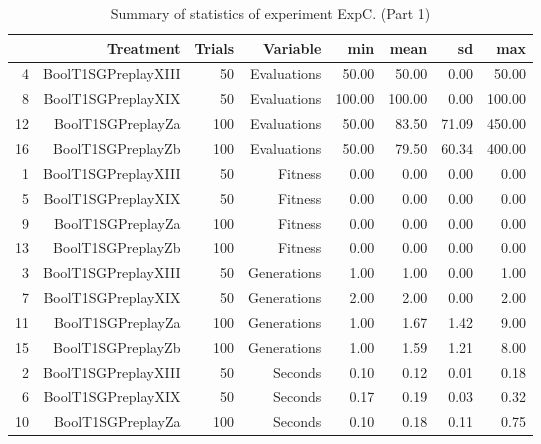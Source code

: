 \begin{table}[ht]
\centering
\begin{tabular}{rrrrrrrr}
  \hline
 & Treatment & Trials & Variable & min & mean & sd & max \\ 
  \hline
4 & BoolT1SGPreplayXIII &  50 & Evaluations & 50.00 & 50.00 & 0.00 & 50.00 \\ 
  8 & BoolT1SGPreplayXIX &  50 & Evaluations & 100.00 & 100.00 & 0.00 & 100.00 \\ 
  12 & BoolT1SGPreplayZa & 100 & Evaluations & 50.00 & 83.50 & 71.09 & 450.00 \\ 
  16 & BoolT1SGPreplayZb & 100 & Evaluations & 50.00 & 79.50 & 60.34 & 400.00 \\ 
  1 & BoolT1SGPreplayXIII &  50 & Fitness & 0.00 & 0.00 & 0.00 & 0.00 \\ 
  5 & BoolT1SGPreplayXIX &  50 & Fitness & 0.00 & 0.00 & 0.00 & 0.00 \\ 
  9 & BoolT1SGPreplayZa & 100 & Fitness & 0.00 & 0.00 & 0.00 & 0.00 \\ 
  13 & BoolT1SGPreplayZb & 100 & Fitness & 0.00 & 0.00 & 0.00 & 0.00 \\ 
  3 & BoolT1SGPreplayXIII &  50 & Generations & 1.00 & 1.00 & 0.00 & 1.00 \\ 
  7 & BoolT1SGPreplayXIX &  50 & Generations & 2.00 & 2.00 & 0.00 & 2.00 \\ 
  11 & BoolT1SGPreplayZa & 100 & Generations & 1.00 & 1.67 & 1.42 & 9.00 \\ 
  15 & BoolT1SGPreplayZb & 100 & Generations & 1.00 & 1.59 & 1.21 & 8.00 \\ 
  2 & BoolT1SGPreplayXIII &  50 & Seconds & 0.10 & 0.12 & 0.01 & 0.18 \\ 
  6 & BoolT1SGPreplayXIX &  50 & Seconds & 0.17 & 0.19 & 0.03 & 0.32 \\ 
  10 & BoolT1SGPreplayZa & 100 & Seconds & 0.10 & 0.18 & 0.11 & 0.75 \\ 
   \hline
\end{tabular}
\caption{Summary of statistics of experiment ExpC. (Part 1)} 
\end{table}
